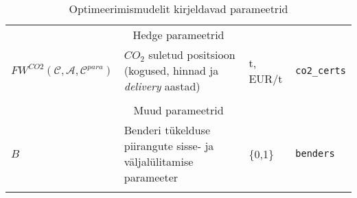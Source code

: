 \begin{landscape}
\begin{longtable}{l l l l}
\\ \multicolumn{4}{c}{Hedge parameetrid} \\
$\mathit{FW}^{CO2}(\mathcal{C}, \mathcal{A}, \mathcal{C}^{para})$ & $CO_2$ suletud positsioon (kogused, hinnad ja \emph{delivery} aastad)& t, EUR/t & \texttt{co2\_certs} \\

\\ \multicolumn{4}{c}{Muud parameetrid} \\
$\mathit{B}$ & Benderi tükelduse piirangute sisse- ja väljalülitamise parameeter & \{0,1\} & \texttt{benders} \\
  
\caption{Optimeerimismudelit kirjeldavad parameetrid \label{tab:para}} 
\end{longtable}
\end{landscape}
